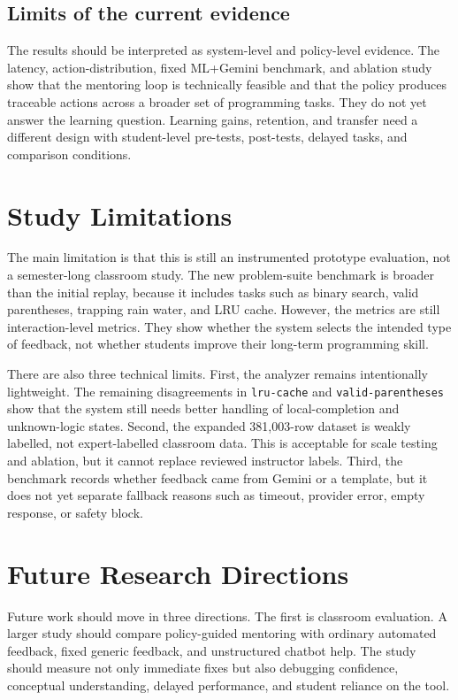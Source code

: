 \documentclass[11pt]{article}
\begin{document}
\subsection{Limits of the current evidence}

The results should be interpreted as system-level and policy-level evidence. The latency, action-distribution, fixed ML+Gemini benchmark, and ablation study show that the mentoring loop is technically feasible and that the policy produces traceable actions across a broader set of programming tasks. They do not yet answer the learning question. Learning gains, retention, and transfer need a different design with student-level pre-tests, post-tests, delayed tasks, and comparison conditions.

\section{Study Limitations}

The main limitation is that this is still an instrumented prototype evaluation, not a semester-long classroom study. The new problem-suite benchmark is broader than the initial replay, because it includes tasks such as binary search, valid parentheses, trapping rain water, and LRU cache. However, the metrics are still interaction-level metrics. They show whether the system selects the intended type of feedback, not whether students improve their long-term programming skill.

There are also three technical limits. First, the analyzer remains intentionally lightweight. The remaining disagreements in \texttt{lru-cache} and \texttt{valid-parentheses} show that the system still needs better handling of local-completion and unknown-logic states. Second, the expanded 381,003-row dataset is weakly labelled, not expert-labelled classroom data. This is acceptable for scale testing and ablation, but it cannot replace reviewed instructor labels. Third, the benchmark records whether feedback came from Gemini or a template, but it does not yet separate fallback reasons such as timeout, provider error, empty response, or safety block.

\section{Future Research Directions}

Future work should move in three directions. The first is classroom evaluation. A larger study should compare policy-guided mentoring with ordinary automated feedback, fixed generic feedback, and unstructured chatbot help. The study should measure not only immediate fixes but also debugging confidence, conceptual understanding, delayed performance, and student reliance on the tool.
\end{document}
